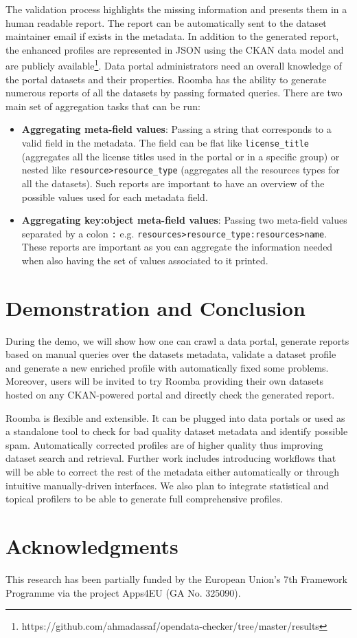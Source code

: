 \documentclass{sig-alternate}
\begin{document}
The validation process highlights the missing information and presents them in a human readable report. The report can be automatically sent to the dataset maintainer email if exists in the metadata.
In addition to the generated report, the enhanced profiles are represented in JSON using the CKAN data model and are publicly available\footnote{https://github.com/ahmadassaf/opendata-checker/tree/master/results}.
Data portal administrators need an overall knowledge of the portal datasets and their properties. Roomba has the ability to generate numerous reports of all the datasets by passing formated queries. There are two main set of aggregation tasks that can be run:
\begin{itemize}
  \item \textbf{Aggregating meta-field values}: Passing a string that corresponds to a valid field in the metadata. The field can be flat like \texttt{license\_title} (aggregates all the license titles used in the portal or in a specific group) or nested like \texttt{resource>resource\_type} (aggregates all the resources types for all the datasets). Such reports are important to have an overview of the possible values used for each metadata field.
  \item \textbf{Aggregating key:object meta-field values}: Passing two meta-field values separated by a colon \texttt{:} e.g. \texttt{resources>resource\_type:resources>name}. These reports are important as you can aggregate the information needed when also having the set of values associated to it printed.
\end{itemize}


\section{Demonstration and Conclusion}
During the demo, we will show how one can crawl a data portal, generate reports based on manual queries over the datasets metadata, validate a dataset profile and generate a new enriched profile with automatically fixed some problems. Moreover, users will be invited to try Roomba providing their own datasets hosted on any CKAN-powered portal and directly check the generated report.

Roomba is flexible and extensible. It can be plugged into data portals or used as a standalone tool to check for bad quality dataset metadata and identify possible spam. Automatically corrected profiles are of higher quality thus improving dataset search and retrieval. Further work includes introducing workflows that will be able to correct the rest of the metadata either automatically or through intuitive manually-driven interfaces. We also plan to integrate statistical and topical profilers to be able to generate full comprehensive profiles.

\section*{Acknowledgments}
This research has been partially funded by the European Union's 7th Framework Programme via the project Apps4EU (GA No. 325090).



\end{document}

